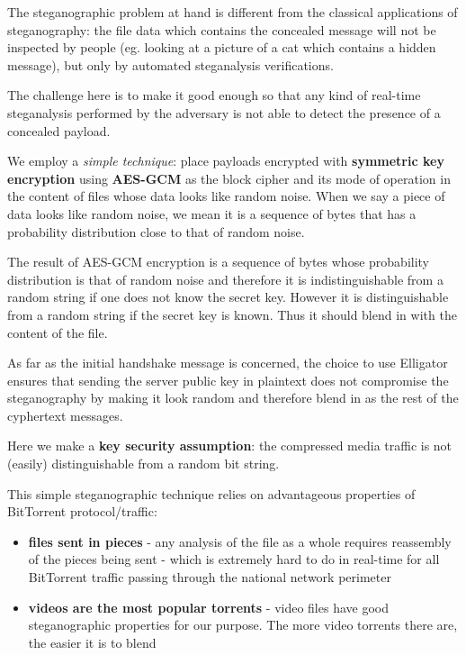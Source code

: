 \documentclass[11pt]{book} %
\begin{document}
The steganographic problem at hand is different from the classical applications of steganography: the file data which contains the concealed message will not be inspected by people (eg. looking at a picture of a cat which contains a hidden message), but only by automated steganalysis verifications.

The challenge here is to make it good enough so that any kind of real-time steganalysis performed by the adversary is not able to detect the presence of a concealed payload.

We employ a \textit{simple technique}: place payloads encrypted with \textbf{symmetric key encryption} using \textbf{AES-GCM} as the block cipher and its mode of operation in the content of files whose data looks like random noise. When we say a piece of data looks like random noise, we mean it is a sequence of bytes that has a probability distribution close to that of random noise.

The result of AES-GCM encryption is a sequence of bytes whose probability distribution is that of random noise and therefore it is indistinguishable from a random string if one does not know the secret key. However it is distinguishable from a random string if the secret key is known. Thus it should blend in with the content of the file.

As far as the initial handshake message is concerned, the choice to use Elligator ensures that sending the server public key in plaintext does not compromise the steganography by making it look random and therefore blend in as the rest of the cyphertext messages.

Here we make a \textbf{key security assumption}: the compressed media traffic is not (easily) distinguishable from a random bit string. 

This simple steganographic technique relies on advantageous properties of BitTorrent protocol/traffic:
\begin{itemize}
\item \textbf{files sent in pieces} - any analysis of the file as a whole requires reassembly of the pieces being sent - which is extremely hard to do in real-time for all BitTorrent traffic passing through the national network perimeter
\item \textbf{videos are the most popular torrents} - video files have good steganographic properties for our purpose. The more video torrents there are, the easier it is to blend
\end{itemize}

\end{document}
